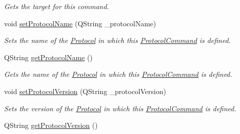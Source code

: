 \begin{DoxyCompactItemize}
\begin{DoxyCompactList}\small\item\em Gets the target for this command. \end{DoxyCompactList}\item 
\hypertarget{struct_picto_1_1_protocol_command_a6cca9f29a32eea2bdd8d0d85cc50d190}{void \hyperlink{struct_picto_1_1_protocol_command_a6cca9f29a32eea2bdd8d0d85cc50d190}{set\-Protocol\-Name} (Q\-String \-\_\-protocol\-Name)}\label{struct_picto_1_1_protocol_command_a6cca9f29a32eea2bdd8d0d85cc50d190}

\begin{DoxyCompactList}\small\item\em Sets the name of the \hyperlink{struct_picto_1_1_protocol}{Protocol} in which this \hyperlink{struct_picto_1_1_protocol_command}{Protocol\-Command} is defined. \end{DoxyCompactList}\item 
\hypertarget{struct_picto_1_1_protocol_command_a5461b44e6341294b70ffeae4bb920ce3}{Q\-String \hyperlink{struct_picto_1_1_protocol_command_a5461b44e6341294b70ffeae4bb920ce3}{get\-Protocol\-Name} ()}\label{struct_picto_1_1_protocol_command_a5461b44e6341294b70ffeae4bb920ce3}

\begin{DoxyCompactList}\small\item\em Gets the name of the \hyperlink{struct_picto_1_1_protocol}{Protocol} in which this \hyperlink{struct_picto_1_1_protocol_command}{Protocol\-Command} is defined. \end{DoxyCompactList}\item 
\hypertarget{struct_picto_1_1_protocol_command_abd2e3a2603f542dde108ee19c0598fba}{void \hyperlink{struct_picto_1_1_protocol_command_abd2e3a2603f542dde108ee19c0598fba}{set\-Protocol\-Version} (Q\-String \-\_\-protocol\-Version)}\label{struct_picto_1_1_protocol_command_abd2e3a2603f542dde108ee19c0598fba}

\begin{DoxyCompactList}\small\item\em Sets the version of the \hyperlink{struct_picto_1_1_protocol}{Protocol} in which this \hyperlink{struct_picto_1_1_protocol_command}{Protocol\-Command} is defined. \end{DoxyCompactList}\item 
\hypertarget{struct_picto_1_1_protocol_command_acb95765354610da75c867b83b706d1d1}{Q\-String \hyperlink{struct_picto_1_1_protocol_command_acb95765354610da75c867b83b706d1d1}{get\-Protocol\-Version} ()}\label{struct_picto_1_1_protocol_command_acb95765354610da75c867b83b706d1d1}


\end{DoxyCompactItemize}
